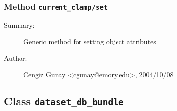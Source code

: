 \subsubsection[Method \texttt{set}]{Method \texttt{current\_clamp/set}}%
%
\label{ref_current_clamp__set}%
\hypertarget{ref_current_clamp__set}{}%
\begin{description}
\item[Summary:]Generic method for setting object attributes.
%
%
%
%
%
%
%
\item[Author:]%
Cengiz Gunay <cgunay@emory.edu>, 2004/10/08
%
\end{description}
\methodline%
\subsection{Class \texttt{dataset\_db\_bundle}}%
%
\label{ref_dataset_db_bundle}%
\hypertarget{ref_dataset_db_bundle}{}%

